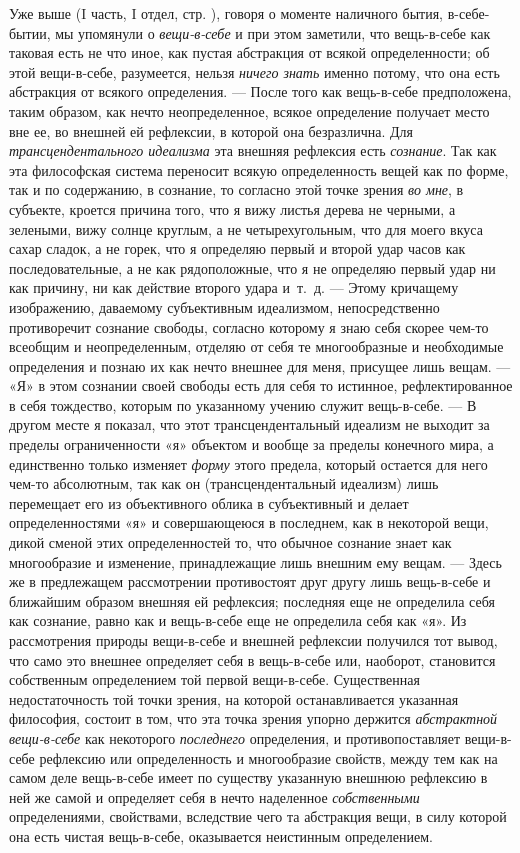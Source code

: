 Уже выше (I часть, I отдел, стр. \pageref{bkm:bmThingInItself}), говоря о
моменте наличного бытия, в-себе-бытии, мы упомянули о
{\em вещи-в-себе} и при этом заметили, что вещь-в-себе
как таковая есть не что иное, как пустая абстракция от всякой
определенности; об этой вещи-в-себе, разумеется, нельзя
{\em ничего знать} именно потому, что она есть
абстракция от всякого определения. — После того как вещь-в-себе
предположена, таким образом, как нечто неопределенное, всякое определение
получает место вне ее, во внешней ей рефлексии, в которой она безразлична.
Для {\em трансцендентального идеализма} эта внешняя
рефлексия есть {\em сознание}. Так как эта философская
система переносит всякую определенность вещей как по форме, так и по
содержанию, в сознание, то согласно этой точке зрения
{\em во мне}, в субъекте, кроется причина того, что я
вижу листья дерева не черными, а зелеными, вижу солнце круглым, а не
четырехугольным, что для моего вкуса сахар сладок, а не горек, что я
определяю первый и второй удар часов как последовательные, а не как
рядоположные, что я не определяю первый удар ни как причину, ни как
действие второго удара и~т.~д. — Этому кричащему изображению, даваемому
субъективным идеализмом, непосредственно противоречит сознание свободы,
согласно которому я знаю себя скорее чем-то всеобщим и неопределенным,
отделяю от себя те многообразные и необходимые определения и познаю их как
нечто внешнее для меня, присущее лишь вещам. — «Я» в этом сознании своей
свободы есть для себя то истинное, рефлектированное в себя тождество,
которым по указанному учению служит вещь-в-себе. — В другом месте я
показал, что этот трансцендентальный идеализм не выходит за пределы
ограниченности «я» объектом и вообще за пределы конечного мира, а
единственно только изменяет {\em форму} этого предела,
который остается для него чем-то абсолютным, так как он (трансцендентальный
идеализм) лишь перемещает его из объективного облика в субъективный и
делает определенностями «я» и совершающеюся в последнем, как в некоторой
вещи, дикой сменой этих определенностей то, что обычное сознание знает как
многообразие и изменение, принадлежащие лишь внешним ему вещам. — Здесь же
в предлежащем рассмотрении противостоят друг другу лишь вещь-в-себе и
ближайшим образом внешняя ей рефлексия; последняя еще не определила себя
как сознание, равно как и вещь-в-себе еще не определила себя как «я». Из
рассмотрения природы вещи-в-себе и внешней рефлексии получился тот вывод,
что само это внешнее определяет себя в вещь-в-себе или, наоборот,
становится собственным определением той первой вещи-в-себе. Существенная
недостаточность той точки зрения, на которой останавливается указанная
философия, состоит в том, что эта точка зрения упорно держится
{\em абстрактной вещи-в-себе} как некоторого
{\em последнего} определения, и противопоставляет
вещи-в-себе рефлексию или определенность и многообразие свойств, между тем
как на самом деле вещь-в-себе имеет по существу указанную внешнюю рефлексию
в ней же самой и определяет себя в нечто наделенное
{\em собственными} определениями, свойствами,
вследствие чего та абстракция вещи, в силу которой она есть чистая
вещь-в-себе, оказывается неистинным определением.

